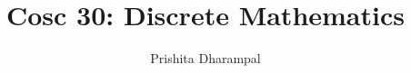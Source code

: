\title{Cosc 30: Discrete Mathematics}

\author{Prishita Dharampal}
\date{}
\maketitle
\vspace{-0.3in}

